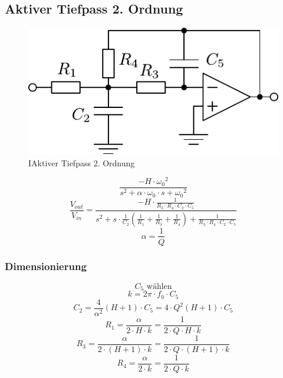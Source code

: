 



\subsection{Aktiver Tiefpass 2. Ordnung}
\begin{figure}[h!]
	\centering
	\includegraphics[scale=\schscale]{op_tp_o2.pdf}
	\caption{IAktiver Tiefpass 2. Ordnung}
	\label{sch:op-tp-o2}
\end{figure}
\[ \frac{-H \cdot {\omega_0}^2}
{s^2 + \alpha \cdot \omega_0 \cdot s + {\omega_0}^2} \]
\[ \frac{V_{out}}{V_{in}} 
= \frac{-H \cdot \frac{1}{R_3 \cdot R_4 \cdot C_2 \cdot C_5}}
{s^2 + s \cdot \frac{1}{C_2} 
\left(\frac{1}{R_1} + \frac{1}{R_3} + \frac{1}{R_4}\right) 
+ \frac{1}{R_3 \cdot R_4 \cdot C_2 \cdot C_5}} \]
\[ \alpha = \frac{1}{Q} \]

\subsubsection{Dimensionierung}
\[ C_5 \text{ wählen} \]
\[ k = 2 \pi \cdot f_0 \cdot C_5 \]
\[ C_2 = \frac{4}{\alpha^2} (H + 1) \cdot C_5 
= 4 \cdot Q^2 (H + 1) \cdot C_5 \]
\[ R_1 = \frac{\alpha}{2 \cdot H \cdot k} 
= \frac{1}{2 \cdot Q \cdot H \cdot k} \]
\[ R_3 = \frac{\alpha}{2 \cdot (H + 1) \cdot k} 
= \frac{1}{2 \cdot Q \cdot (H + 1) \cdot k} \]
\[ R_4 = \frac{\alpha}{2 \cdot k} = \frac{1}{2 \cdot Q \cdot k} \]
